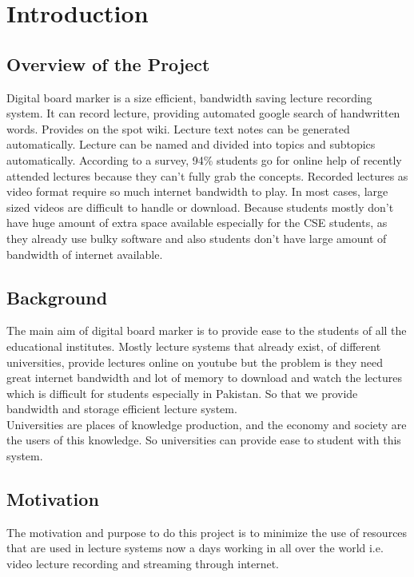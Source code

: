 
\chapter{Introduction} %
\label{Chapter1}
\section{Overview of the Project}
Digital board marker is a size efficient, bandwidth saving lecture recording system. It can record lecture, providing automated google search of handwritten words. Provides on the spot wiki. Lecture text notes can be generated automatically. Lecture can be named and divided into topics and subtopics automatically. According to a survey, 94\% students go for online help of recently attended lectures because they can't fully grab the concepts. Recorded lectures as video format require so much internet bandwidth to play. In most cases, large sized videos are difficult to handle or download. Because students mostly don't have huge amount of extra space available especially for the CSE students, as they already use bulky software and also students don't have large amount of bandwidth of internet available.
\bigskip

\section{Background}
The main aim of digital board marker is to provide ease to the students of all the educational institutes. Mostly lecture systems that already exist, of different universities, provide lectures online on youtube but the problem is they need great internet bandwidth and lot of memory to download and watch the lectures which is difficult for students especially in Pakistan. So that we provide bandwidth and storage efficient lecture system.\\
Universities are places of knowledge production, and the economy and society are the users of this knowledge. So universities can provide ease to student with this system.
\bigskip

\section{Motivation}
The motivation and purpose to do this project is to minimize the use of resources that are used in lecture systems now a days working in all over the world i.e. video lecture recording and streaming through internet. 

